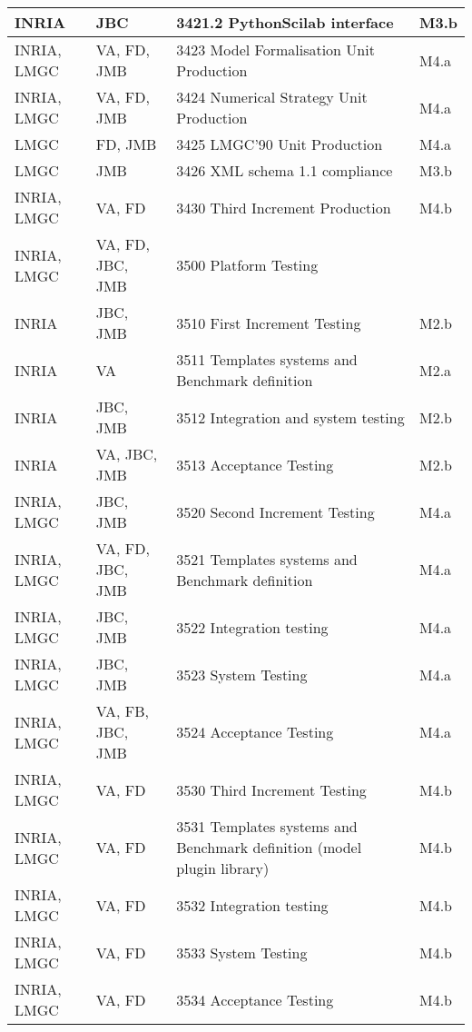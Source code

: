 \begin{longtable}{|l|l|l|l|}
  INRIA & JBC &   3421.2 PythonScilab interface         & M3.b \\ \hline
  INRIA, LMGC & VA, FD, JMB &   3423 Model Formalisation Unit Production  & M4.a \\ \hline
  INRIA, LMGC & VA, FD, JMB &   3424 Numerical Strategy Unit Production  & M4.a \\ \hline
  LMGC & FD, JMB &   3425 LMGC'90 Unit Production               & M4.a \\ \hline
  LMGC & JMB &   3426 XML schema 1.1 compliance                 & M3.b \\ \hline
  INRIA, LMGC & VA, FD &   3430 Third Increment Production  & M4.b \\ \hline 
  INRIA, LMGC & VA, FD, JBC, JMB &   3500 Platform Testing  &  \\ \hline
  INRIA & JBC, JMB &   3510 First Increment Testing                     & M2.b \\ \hline
  INRIA & VA &   3511 Templates systems and Benchmark definition & M2.a \\ \hline
  INRIA & JBC, JMB &   3512 Integration and system testing      & M2.b \\ \hline
  INRIA & VA, JBC, JMB &   3513 Acceptance Testing                      & M2.b \\ \hline
  INRIA, LMGC & JBC, JMB &   3520 Second Increment Testing      & M4.a \\ \hline
  INRIA, LMGC & VA, FD, JBC, JMB &   3521 Templates systems and Benchmark definition & M4.a \\ \hline
  INRIA, LMGC & JBC, JMB &   3522 Integration testing                   & M4.a \\ \hline
  INRIA, LMGC & JBC, JMB &   3523 System Testing                                & M4.a \\ \hline
  INRIA, LMGC & VA, FB, JBC, JMB &   3524 Acceptance Testing    & M4.a \\ \hline
  INRIA, LMGC & VA, FD &   3530 Third Increment Testing                 & M4.b \\ \hline
  INRIA, LMGC & VA, FD &   3531 Templates systems and Benchmark definition (model plugin library) & M4.b \\ \hline
  INRIA, LMGC & VA, FD &   3532 Integration testing             & M4.b \\ \hline
  INRIA, LMGC & VA, FD &   3533 System Testing                          & M4.b \\ \hline
  INRIA, LMGC & VA, FD &   3534 Acceptance Testing              & M4.b \\ \hline

\end{longtable}
